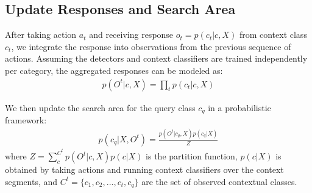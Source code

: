 % 
% 






\subsection{Update Responses and Search Area}
After taking action $a_t$ and receiving response $o_t = p(c_t|c, X)$ from context class $c_t$, we integrate the response into observations from the previous sequence of actions. Assuming the detectors and context classifiers are trained independently per category, the aggregated responses can be modeled as:
\begin{eqnarray}
p(O^t|c, X) = \prod_t p(c_t|c,X)
\end{eqnarray}

We then update the search area for the query class $c_q$ in a probabilistic framework:
\begin{eqnarray}
p(c_q|X,O^t) = \frac{p(O^t|c_q,X)p(c_q|X)}{Z}
\end{eqnarray}
where $Z = \sum_c^{C^t} p(O^t|c,X)p(c|X)$ is the partition function, $p(c|X)$ is obtained by taking actions and running context classifiers over the context segments,  and $C^t = \{c_1, c_2, ..., c_t, c_q\}$ are the set of observed contextual classes.
